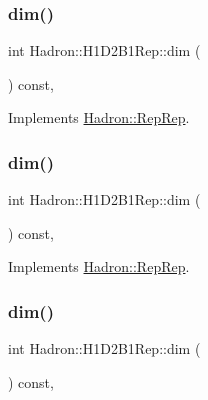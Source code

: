 \subsubsection{\texorpdfstring{dim()}{dim()}\hspace{0.1cm}{\footnotesize\ttfamily [3/5]}}
{\footnotesize\ttfamily int Hadron\+::\+H1\+D2\+B1\+Rep\+::dim (\begin{DoxyParamCaption}{ }\end{DoxyParamCaption}) const\hspace{0.3cm}{\ttfamily [inline]}, {\ttfamily [virtual]}}



Implements \mbox{\hyperlink{structHadron_1_1RepRep_a92c8802e5ed7afd7da43ccfd5b7cd92b}{Hadron\+::\+Rep\+Rep}}.

\mbox{\label{structHadron_1_1H1D2B1Rep_a0b9935c70773e15e4494ab8f09eb29c7}} 
\subsubsection{\texorpdfstring{dim()}{dim()}\hspace{0.1cm}{\footnotesize\ttfamily [4/5]}}
{\footnotesize\ttfamily int Hadron\+::\+H1\+D2\+B1\+Rep\+::dim (\begin{DoxyParamCaption}{ }\end{DoxyParamCaption}) const\hspace{0.3cm}{\ttfamily [inline]}, {\ttfamily [virtual]}}



Implements \mbox{\hyperlink{structHadron_1_1RepRep_a92c8802e5ed7afd7da43ccfd5b7cd92b}{Hadron\+::\+Rep\+Rep}}.

\mbox{\label{structHadron_1_1H1D2B1Rep_a0b9935c70773e15e4494ab8f09eb29c7}} 
\subsubsection{\texorpdfstring{dim()}{dim()}\hspace{0.1cm}{\footnotesize\ttfamily [5/5]}}
{\footnotesize\ttfamily int Hadron\+::\+H1\+D2\+B1\+Rep\+::dim (\begin{DoxyParamCaption}{ }\end{DoxyParamCaption}) const\hspace{0.3cm}{\ttfamily [inline]}, {\ttfamily [virtual]}}



